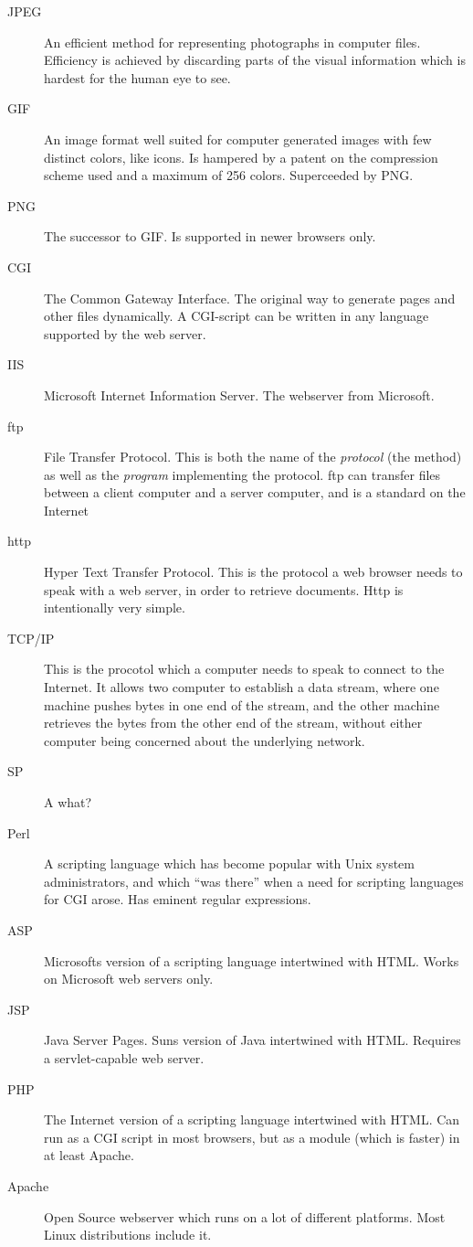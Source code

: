 \begin{description}
\item[JPEG] An efficient method for representing photographs in
  computer files.  Efficiency is achieved by discarding parts of the
  visual information which is hardest for the human eye to see.
\item[GIF] An image format well suited for computer generated images
  with few distinct colors, like icons.  Is hampered by a patent on
  the compression scheme used and a maximum of 256 colors.
  Superceeded by PNG.
\item[PNG] The successor to GIF.  Is supported in newer browsers
  only.  
\item[CGI] The Common Gateway Interface.  The original way to generate
  pages and other files dynamically.  A CGI-script can be written in
  any language supported by the web server.

\item[IIS] Microsoft Internet Information Server.  The webserver from
  Microsoft. 
  
\item[ftp] File Transfer Protocol.  This is both the name of the
  \textit{protocol} (the method) as well as the \textit{program}
  implementing the protocol.  ftp can transfer files between a client
  computer and a server computer, and is a standard on the Internet
  
\item[http] Hyper Text Transfer Protocol.  This is the protocol a web
  browser needs to speak with a web server, in order to retrieve
  documents.  Http is intentionally very simple.
\item[TCP/IP] This is the procotol which a computer needs to speak to
  connect to the Internet.  It allows two computer to establish a data
  stream, where one machine pushes bytes in one end of the stream, and
  the other machine retrieves the bytes from the other end of the
  stream, without either computer being concerned about the underlying
  network. 
\item[SP] A \textsf{what}?
\item[Perl] A scripting language which has become popular with Unix
  system administrators, and which ``was there'' when a need for
  scripting languages for CGI arose.  Has eminent regular expressions.
\item[ASP] Microsofts version of a scripting language intertwined with
  HTML. Works on Microsoft web servers only.
\item[JSP] Java Server Pages.  Suns version of Java intertwined with
  HTML.  Requires a servlet-capable web server.
\item[PHP] The Internet version of a scripting language intertwined
  with HTML.  Can run as a CGI script in most browsers, but as a
  module (which is faster) in at least Apache.
\item[Apache] Open Source webserver which runs on a lot of different
  platforms.  Most Linux distributions include it.
\end{description}

  

    
